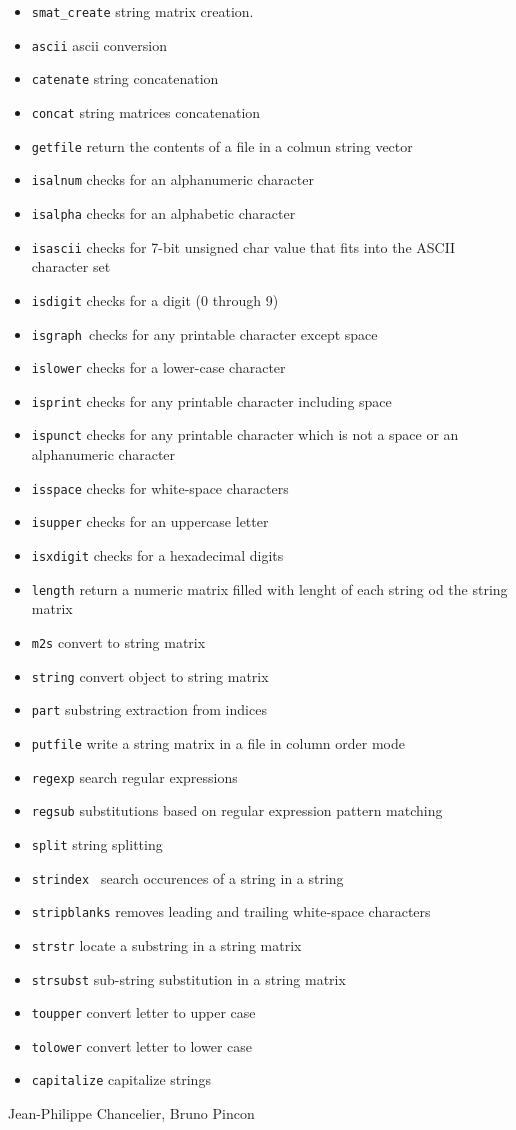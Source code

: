 \begin{itemize}
\item \verb+smat_create+ string matrix creation.
\item \verb+ascii+ ascii conversion 
\item \verb+catenate+ string concatenation 
\item \verb+concat+ string matrices concatenation 
\item \verb+getfile+ return the contents of a file in a colmun string vector 
\item \verb+isalnum+ checks for an alphanumeric character 
\item \verb+isalpha+ checks for an alphabetic character
\item \verb+isascii+ checks for 7-bit unsigned char value that fits into the ASCII character set 
\item \verb+isdigit+ checks for a digit (0 through 9) 
\item \verb+isgraph +checks for any printable character except space 
\item \verb+islower+ checks for a lower-case character 
\item \verb+isprint+  checks for any printable character including space 
\item \verb+ispunct+ checks for any printable character which is not a space or an alphanumeric character 
\item \verb+isspace+  checks for white-space characters 
\item \verb+isupper+  checks for an uppercase letter 
\item \verb+isxdigit+  checks for a hexadecimal digits 
\item \verb+length+  return a numeric matrix filled with lenght of each string od the string matrix
\item \verb+m2s+  convert to string matrix 
\item \verb+string+  convert object to string matrix 
\item \verb+part+ substring extraction from indices 
\item \verb+putfile+  write a string matrix in a file in column order mode 
\item \verb+regexp+  search regular expressions 
\item \verb+regsub+ substitutions based on regular expression pattern matching 
\item \verb+split+ string splitting 
\item \verb+strindex + search occurences of a string in a string 
\item \verb+stripblanks+ removes leading and trailing white-space characters 
\item \verb+strstr+  locate a substring in a string matrix 
\item \verb+strsubst+ sub-string substitution in a string matrix 
\item \verb+toupper+ convert letter to upper case 
\item \verb+tolower+  convert letter to lower case 
\item \verb+capitalize+ capitalize strings 
\end{itemize}

\begin{manseealso}

\end{manseealso}

\begin{authors}
   Jean-Philippe Chancelier, Bruno Pincon
\end{authors}
